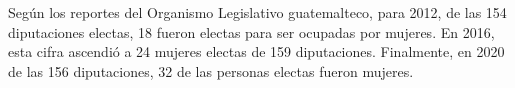 Según los reportes del Organismo Legislativo guatemalteco, para 2012, de las 154 diputaciones electas, 18 fueron electas para ser ocupadas por mujeres. En 2016, esta cifra ascendió a 24 mujeres electas de 159 diputaciones. Finalmente, en 2020 de las 156 diputaciones, 32 de las personas electas fueron mujeres. 